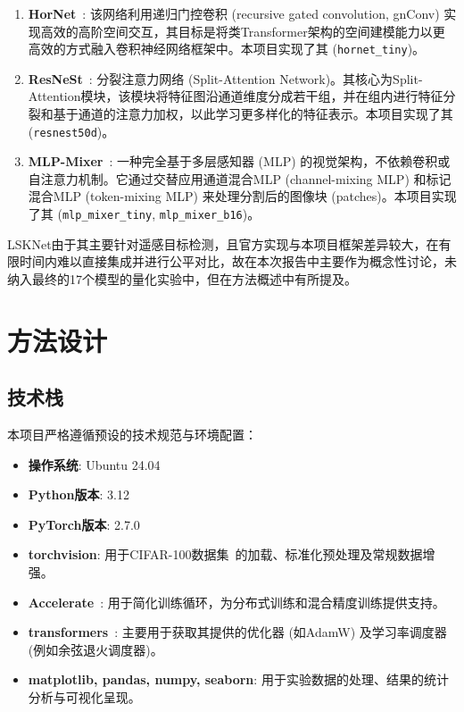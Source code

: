 \documentclass[a4paper]{article}
\begin{document}
\begin{enumerate}
    \item \textbf{HorNet}~\cite{rao2022hornet}: 该网络利用递归门控卷积 (recursive gated convolution, gnConv) 实现高效的高阶空间交互，其目标是将类Transformer架构的空间建模能力以更高效的方式融入卷积神经网络框架中。本项目实现了其 (\texttt{hornet\_tiny})。
    
    \item \textbf{ResNeSt}~\cite{zhang2022resnest}: 分裂注意力网络 (Split-Attention Network)。其核心为Split-Attention模块，该模块将特征图沿通道维度分成若干组，并在组内进行特征分裂和基于通道的注意力加权，以此学习更多样化的特征表示。本项目实现了其 (\texttt{resnest50d})。
    
    \item \textbf{MLP-Mixer}~\cite{tolstikhin2021mlp}: 一种完全基于多层感知器 (MLP) 的视觉架构，不依赖卷积或自注意力机制。它通过交替应用通道混合MLP (channel-mixing MLP) 和标记混合MLP (token-mixing MLP) 来处理分割后的图像块 (patches)。本项目实现了其 (\texttt{mlp\_mixer\_tiny}, \texttt{mlp\_mixer\_b16})。
\end{enumerate}

LSKNet由于其主要针对遥感目标检测，且官方实现与本项目框架差异较大，在有限时间内难以直接集成并进行公平对比，故在本次报告中主要作为概念性讨论，未纳入最终的17个模型的量化实验中，但在方法概述中有所提及。

\section{方法设计}
\subsection{技术栈}
本项目严格遵循预设的技术规范与环境配置：
\begin{itemize}
    \item \textbf{操作系统}: Ubuntu 24.04
    \item \textbf{Python版本}: 3.12
    \item \textbf{PyTorch版本}: 2.7.0~\cite{paszke2019pytorch}
    \item \textbf{torchvision}: 用于CIFAR-100数据集~\cite{krizhevsky2009learning}的加载、标准化预处理及常规数据增强。
    \item \textbf{Accelerate}~\cite{huggingfaceaccelerate}: 用于简化训练循环，为分布式训练和混合精度训练提供支持。
    \item \textbf{transformers}~\cite{wolf2020transformers}: 主要用于获取其提供的优化器 (如AdamW) 及学习率调度器 (例如余弦退火调度器)。
    \item \textbf{matplotlib, pandas, numpy, seaborn}: 用于实验数据的处理、结果的统计分析与可视化呈现。
\end{itemize}
\end{document}
